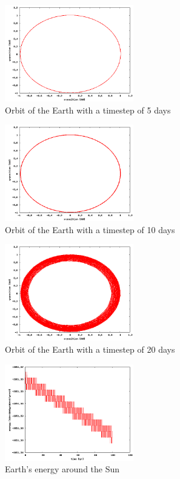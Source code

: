 \documentclass[a4wide,12pt]{article}
\begin{document}
\begin{figure}[p]
 \includegraphics[width=0.5\textwidth]{jordmedsoldt5}
 \caption{Orbit of the Earth with a timestep of 5 days}
 \label{fig:05} 
\end{figure}
\begin{figure}[p]
 \includegraphics[width=0.5\textwidth]{jordmedsoldt10}
 \caption{Orbit of the Earth with a timestep of 10 days}
 \label{fig:06} 
\end{figure}
\begin{figure}[p]
 \includegraphics[width=0.5\textwidth]{jordmedsoldt20}
 \caption{Orbit of the Earth with a timestep of 20 days}
 \label{fig:07} 
\end{figure}
\begin{figure}[p]
 \includegraphics[width=0.5\textwidth]{energy}
 \caption{Earth's energy around the Sun}
 \label{fig:08} 
\end{figure}
\end{document}
